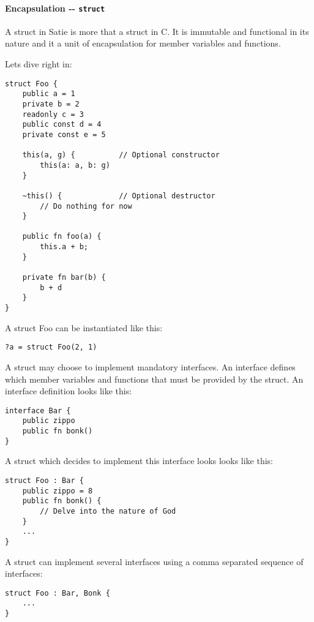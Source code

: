 \hypertarget{encapsulation----struct}{%
\paragraph{\texorpdfstring{Encapsulation -\/-
\texttt{struct}}{Encapsulation -\/- struct}}\label{encapsulation----struct}}

A struct in Satie is more that a struct in C. It is immutable and
functional in its nature and it a unit of encapsulation for member
variables and functions.

Lets dive right in:

\begin{verbatim}
struct Foo {
    public a = 1
    private b = 2
    readonly c = 3
    public const d = 4
    private const e = 5

    this(a, g) {          // Optional constructor
        this(a: a, b: g)
    }

    ~this() {             // Optional destructor
        // Do nothing for now
    }

    public fn foo(a) {
        this.a + b;
    }

    private fn bar(b) {
        b + d
    }
}
\end{verbatim}

A struct Foo can be instantiated like this:

\begin{verbatim}
?a = struct Foo(2, 1)
\end{verbatim}

A struct may choose to implement mandatory interfaces. An interface
defines which member variables and functions that must be provided by
the struct. An interface definition looks like this:

\begin{verbatim}
interface Bar {
    public zippo
    public fn bonk()
}
\end{verbatim}

A struct which decides to implement this interface looks looks like
this:

\begin{verbatim}
struct Foo : Bar {
    public zippo = 8
    public fn bonk() {
        // Delve into the nature of God
    }
    ...
}
\end{verbatim}

A struct can implement several interfaces using a comma separated
sequence of interfaces:

\begin{verbatim}
struct Foo : Bar, Bonk {
    ...
}
\end{verbatim}

